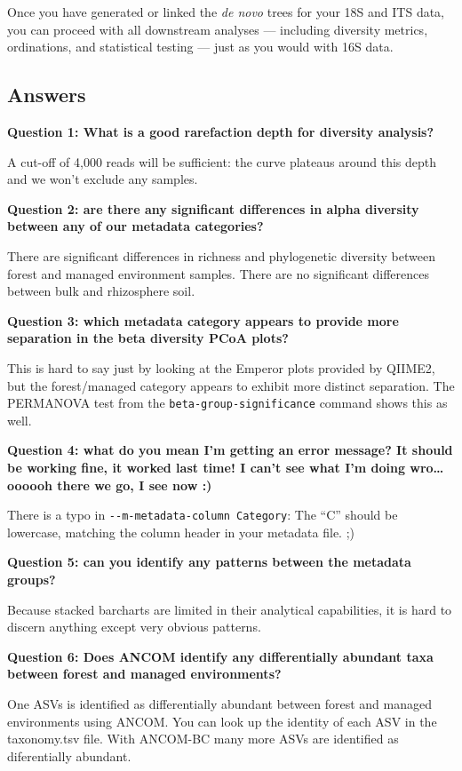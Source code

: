 \documentclass[
]{book}
\begin{document}
Once you have generated or linked the \emph{de novo} trees for your 18S and ITS data, you can proceed with all downstream analyses --- including diversity metrics, ordinations, and statistical testing --- just as you would with 16S data.

\subsection{Answers}\label{answers-1}

\textbf{Question 1: What is a good rarefaction depth for diversity analysis?}

A cut-off of 4,000 reads will be sufficient: the curve plateaus around this depth and we won't exclude any samples.

\textbf{Question 2: are there any significant differences in alpha diversity between any of our metadata categories?}

There are significant differences in richness and phylogenetic diversity between forest and managed environment samples. There are no significant differences between bulk and rhizosphere soil.

\textbf{Question 3: which metadata category appears to provide more separation in the beta diversity PCoA plots?}

This is hard to say just by looking at the Emperor plots provided by QIIME2, but the forest/managed category appears to exhibit more distinct separation. The PERMANOVA test from the \texttt{beta-group-significance} command shows this as well.

\textbf{Question 4: what do you mean I'm getting an error message? It should be working fine, it worked last time! I can't see what I'm doing wro\ldots{} oooooh there we go, I see now :)}

There is a typo in \texttt{-\/-m-metadata-column\ Category}: The ``C'' should be lowercase, matching the column header in your metadata file. ;)

\textbf{Question 5: can you identify any patterns between the metadata groups?}

Because stacked barcharts are limited in their analytical capabilities, it is hard to discern anything except very obvious patterns.

\textbf{Question 6: Does ANCOM identify any differentially abundant taxa between forest and managed environments?}

One ASVs is identified as differentially abundant between forest and managed environments using ANCOM. You can look up the identity of each ASV in the taxonomy.tsv file. With ANCOM-BC many more ASVs are identified as diferentially abundant.
\end{document}
